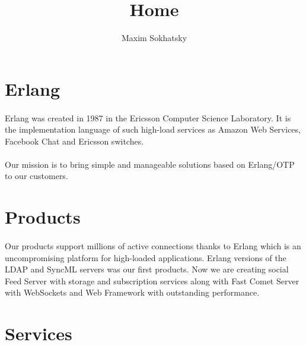 \documentclass[11pt]{article}
\begin{document}
\title{Home}
\author{Maxim Sokhatsky}


\section*{Erlang}
\paragraph{}
Erlang was created in 1987 in the Ericsson Computer Science Laboratory.
It is the implementation language of such high-load services as Amazon Web Services,
Facebook Chat and Ericsson switches.

\paragraph{}
Our mission is to bring simple and manageable solutions based on Erlang/OTP to our customers.


\section*{Products}
\paragraph{}
Our products support millions of active connections thanks to Erlang which is
an uncompromising platform for high-loaded applications.
Erlang versions of the LDAP and SyncML servers was our first products. Now we are
creating social Feed Server with storage and subscription services along with
Fast Comet Server with WebSockets and Web Framework with outstanding performance.

\section*{Services}
\end{document}
